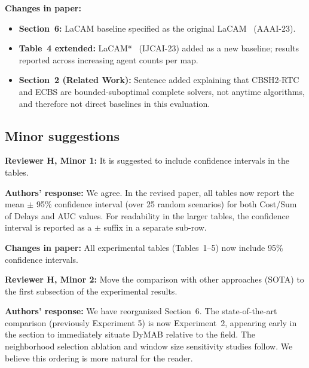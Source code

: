 \documentclass[review]{jair}
\begin{document}
\begin{changebox}
\textbf{Changes in paper:}
\begin{itemize}[leftmargin=1.5em]
  \item \textbf{Section~6:} LaCAM baseline specified as the original LaCAM~\citep{LaCam} (AAAI-23).
  \item \textbf{Table~4 extended:} LaCAM*~\citep{LaCamStar} (IJCAI-23) added as a new baseline; results reported across increasing agent counts per map.
  \item \textbf{Section~2 (Related Work):} Sentence added explaining that CBSH2-RTC and ECBS are bounded-suboptimal complete solvers, not anytime algorithms, and therefore not direct baselines in this evaluation.
\end{itemize}
\end{changebox}

\subsection*{Minor suggestions}

\begin{reviewerbox}
\textbf{Reviewer H, Minor 1:} It is suggested to include confidence intervals in the tables.
\end{reviewerbox}

\begin{authorbox}
\textbf{Authors' response:} We agree. In the revised paper, all tables now report the mean $\pm$ 95\% confidence interval (over 25 random scenarios) for both Cost/Sum of Delays and AUC values. For readability in the larger tables, the confidence interval is reported as a $\pm$ suffix in a separate sub-row.
\end{authorbox}

\begin{changebox}
\textbf{Changes in paper:} All experimental tables (Tables~1--5) now include 95\% confidence intervals.
\end{changebox}

\bigskip

\begin{reviewerbox}
\textbf{Reviewer H, Minor 2:} Move the comparison with other approaches (SOTA) to the first subsection of the experimental results.
\end{reviewerbox}

\begin{authorbox}
\textbf{Authors' response:} We have reorganized Section~6. The state-of-the-art comparison (previously Experiment 5) is now Experiment~2, appearing early in the section to immediately situate DyMAB relative to the field. The neighborhood selection ablation and window size sensitivity studies follow. We believe this ordering is more natural for the reader.
\end{authorbox}
\end{document}
